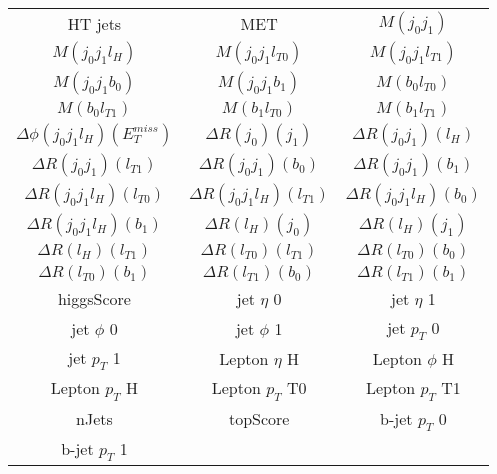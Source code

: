   \begin{center}
  \begin{tabular}{ccc}
    \hline\hline
    HT jets & MET & $M(j_0j_1)$ \\
    $M(j_0j_1l_{H})$ & $M(j_0j_1l_{T0})$ & $M(j_0j_1l_{T1})$ \\
    $M(j_0j_1b_0)$ & $M(j_0j_1b_1)$ & $M(b_0l_{T0})$ \\
    $M(b_0l_{T1})$ & $M(b_1l_{T0})$ & $M(b_1l_{T1})$ \\
    $\Delta\phi(j_0j_1l_{H})(E_T^{miss})$ & $\Delta R(j_0)(j_1)$ & $\Delta R(j_0j_1)(l_{H})$ \\
    $\Delta R(j_0j_1)(l_{T1})$ & $\Delta R(j_0j_1)(b_0)$ & $\Delta R(j_0j_1)(b_1)$ \\
    $\Delta R(j_0j_1l_{H})(l_{T0})$ & $\Delta R(j_0j_1l_{H})(l_{T1})$ & $\Delta R(j_0j_1l_{H})(b_0)$ \\
    $\Delta R(j_0j_1l_{H})(b_1)$ & $\Delta R(l_{H})(j_0)$ & $\Delta R(l_{H})(j_1)$ \\
    $\Delta R(l_{H})(l_{T1})$ & $\Delta R(l_{T0})(l_{T1})$ & $\Delta R(l_{T0})(b_0)$ \\
    $\Delta R(l_{T0})(b_1)$ & $\Delta R(l_{T1})(b_0)$ & $\Delta R(l_{T1})(b_1)$ \\
    higgsScore & jet  $\eta$ 0 & jet  $\eta$ 1 \\
    jet $\phi$ 0 & jet $\phi$ 1 & jet  $p_T$ 0 \\
    jet  $p_T$ 1 & Lepton  $\eta$ H & Lepton $\phi$ H \\
    Lepton  $p_T$ H & Lepton  $p_T$ T0 & Lepton  $p_T$ T1 \\
    nJets & topScore & b-jet $p_T$ 0 \\
    b-jet $p_T$ 1 & & \\
    \hline
  \end{tabular}
  \end{center}

